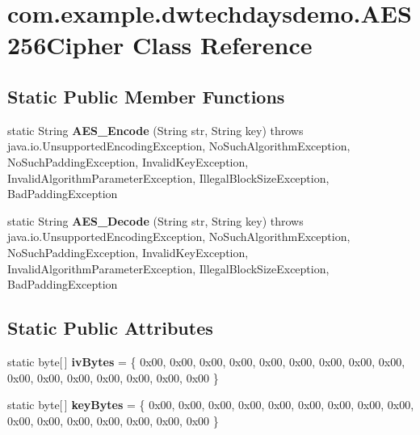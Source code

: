 \hypertarget{classcom_1_1example_1_1dwtechdaysdemo_1_1_a_e_s256_cipher}{}\section{com.\+example.\+dwtechdaysdemo.\+A\+E\+S256\+Cipher Class Reference}
\label{classcom_1_1example_1_1dwtechdaysdemo_1_1_a_e_s256_cipher}
\subsection*{Static Public Member Functions}
\begin{DoxyCompactItemize}
\item 
static String {\bfseries A\+E\+S\+\_\+\+Encode} (String str, String key)  throws java.\+io.\+Unsupported\+Encoding\+Exception, No\+Such\+Algorithm\+Exception, No\+Such\+Padding\+Exception, Invalid\+Key\+Exception, Invalid\+Algorithm\+Parameter\+Exception,	\+Illegal\+Block\+Size\+Exception, Bad\+Padding\+Exception \hypertarget{classcom_1_1example_1_1dwtechdaysdemo_1_1_a_e_s256_cipher_a97f7c104da946fe9b28e7bb68b5ba607}{}\label{classcom_1_1example_1_1dwtechdaysdemo_1_1_a_e_s256_cipher_a97f7c104da946fe9b28e7bb68b5ba607}

\item 
static String {\bfseries A\+E\+S\+\_\+\+Decode} (String str, String key)  throws java.\+io.\+Unsupported\+Encoding\+Exception, No\+Such\+Algorithm\+Exception, No\+Such\+Padding\+Exception, Invalid\+Key\+Exception, Invalid\+Algorithm\+Parameter\+Exception, Illegal\+Block\+Size\+Exception, Bad\+Padding\+Exception \hypertarget{classcom_1_1example_1_1dwtechdaysdemo_1_1_a_e_s256_cipher_a7a122dbded6e7fc850a069c4864336e1}{}\label{classcom_1_1example_1_1dwtechdaysdemo_1_1_a_e_s256_cipher_a7a122dbded6e7fc850a069c4864336e1}

\end{DoxyCompactItemize}
\subsection*{Static Public Attributes}
\begin{DoxyCompactItemize}
\item 
static byte\mbox{[}$\,$\mbox{]} {\bfseries iv\+Bytes} = \{ 0x00, 0x00, 0x00, 0x00, 0x00, 0x00, 0x00, 0x00, 0x00, 0x00, 0x00, 0x00, 0x00, 0x00, 0x00, 0x00 \}\hypertarget{classcom_1_1example_1_1dwtechdaysdemo_1_1_a_e_s256_cipher_a7851e04c17d2133f4c66b8ce11cad199}{}\label{classcom_1_1example_1_1dwtechdaysdemo_1_1_a_e_s256_cipher_a7851e04c17d2133f4c66b8ce11cad199}

\item 
static byte\mbox{[}$\,$\mbox{]} {\bfseries key\+Bytes} = \{ 0x00, 0x00, 0x00, 0x00, 0x00, 0x00, 0x00, 0x00, 0x00, 0x00, 0x00, 0x00, 0x00, 0x00, 0x00, 0x00 \}\hypertarget{classcom_1_1example_1_1dwtechdaysdemo_1_1_a_e_s256_cipher_a595598295e8b7294b71f528029b3c09f}{}\label{classcom_1_1example_1_1dwtechdaysdemo_1_1_a_e_s256_cipher_a595598295e8b7294b71f528029b3c09f}

\end{DoxyCompactItemize}


